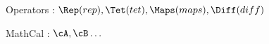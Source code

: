 \documentclass{article}
\begin{document}
Operators : $\Rep(rep), \Tet(tet), \Maps(maps), \Diff(diff)$


MathCal : $\cA , \cB \dots$
\end{document}
